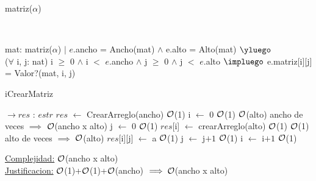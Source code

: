 \begin{Representacion}
	
	
	\begin{Estructura}{matriz($\alpha$)}
		 \begin{Tupla}[estr]
		\end{Tupla}
	\end{Estructura}
	
	
	~	
	
	{mat: matriz($\alpha$) $|$ $e$.ancho = Ancho(mat) $\land$ e.alto = Alto(mat) $\yluego$\\
	($\forall$ i, j: nat) i $\geq$ $0$ $\land$ i $<$ $e$.ancho $\land$ j $\geq$ $0$ $\land$ j $<$ $e$.alto $\impluego$ e.matriz[i][j] = Valor?(mat, i, j) }
	
\begin{Algoritmos}
	
	\begin{algorithm}[H]
		\caption{iCrearMatriz}
		
		\begin{algorithmic}[1]
			 $\to res$ : $estr$
			\State $res$ $\leftarrow$ CrearArreglo(ancho) \Comment $\mathcal{O}$(1)
			\State i $\leftarrow$ $0$ \Comment $\mathcal{O}$(1)
			 \Comment $\mathcal{O}$(alto) ancho de veces $\implies$ $\mathcal{O}$(ancho x alto)
				\State j $\leftarrow$ $0$ \Comment $\mathcal{O}$(1)
				\State $res$[i] $\leftarrow$ crearArreglo(alto) \Comment $\mathcal{O}$(1)
				 \Comment $\mathcal{O}$(1) alto de veces $\implies$  $\mathcal{O}$(alto)
					\State $res$[i][j] $\leftarrow$ a \Comment $\mathcal{O}$(1)
					\State j $\leftarrow$ j$+1$ \Comment $\mathcal{O}$(1)
				\EndWhile
				\State i $\leftarrow$ i$+1$ \Comment $\mathcal{O}$(1)
			\EndWhile
			\EndProcedure
		\end{algorithmic}
		\underline{Complejidad:} $\mathcal{O}$(ancho x alto)
		\\
		\underline{Justificacion:} $\mathcal{O}$(1)+$\mathcal{O}$(1)+$\mathcal{O}$(ancho) $\implies \mathcal{O}$(ancho x alto)
		

\end{algorithm}
\end{Algoritmos}
\end{Representacion}
